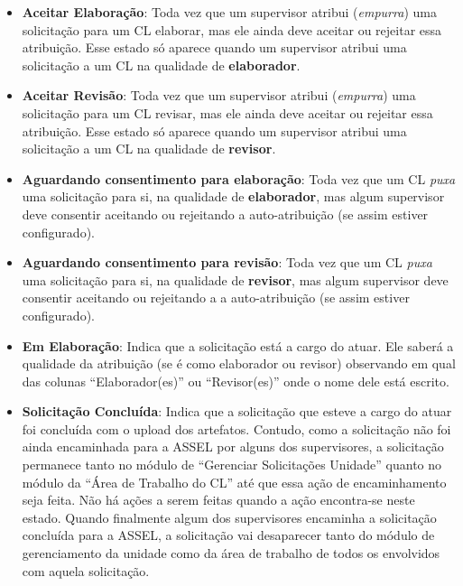 \begin{itemize}
	\item \textbf{Aceitar Elaboração}: Toda vez que um supervisor atribui (\emph{empurra}) uma solicitação para um CL elaborar, mas ele ainda deve aceitar ou rejeitar essa atribuição. Esse estado só aparece quando um supervisor atribui uma solicitação a um CL na qualidade de \textbf{elaborador}.
	
	\item \textbf{Aceitar Revisão}: Toda vez que um supervisor atribui (\emph{empurra}) uma solicitação para um CL revisar, mas ele ainda deve aceitar ou rejeitar essa atribuição. Esse estado só aparece quando um supervisor atribui uma solicitação a um CL na qualidade de \textbf{revisor}.

	\item \textbf{Aguardando consentimento para elaboração}: Toda vez que um CL \emph{puxa} uma solicitação para si, na qualidade de \textbf{elaborador}, mas algum supervisor deve consentir aceitando ou rejeitando a auto-atribuição (se assim estiver configurado).

	\item \textbf{Aguardando consentimento para revisão}: Toda vez que um CL \emph{puxa} uma solicitação para si, na qualidade de \textbf{revisor}, mas algum supervisor deve consentir aceitando ou rejeitando a a auto-atribuição (se assim estiver configurado).
	
	\item \textbf{Em Elaboração}: Indica que a solicitação está a cargo do \CL atuar. Ele saberá a qualidade da atribuição (se é como elaborador ou revisor) observando em qual das colunas ``Elaborador(es)'' ou ``Revisor(es)'' onde o nome dele está escrito. 
	
	\item \textbf{Solicitação Concluída}: Indica que a solicitação que esteve a cargo do \CL atuar foi concluída com o upload dos artefatos. Contudo, como a solicitação não foi ainda encaminhada para a ASSEL por alguns dos supervisores, a solicitação permanece tanto no módulo de ``Gerenciar Solicitações Unidade'' quanto no módulo da ``Área de Trabalho do CL'' até que essa ação de encaminhamento seja feita. Não há ações a serem feitas quando a ação encontra-se neste estado. Quando finalmente algum dos supervisores encaminha a solicitação concluída para a ASSEL, a solicitação vai desaparecer tanto do módulo de gerenciamento da unidade como da área de trabalho de todos os \CLs envolvidos com aquela solicitação.
\end{itemize}

